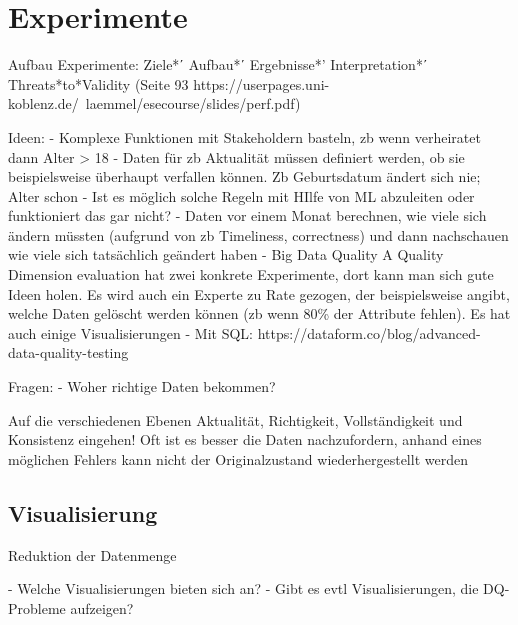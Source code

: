 \chapter{Experimente}\label{ch:experiments}

Aufbau Experimente: 
Ziele*ʹ Aufbau*ʹ Ergebnisse*' Interpretation*ʹ Threats*to*Validity
(Seite 93 https://userpages.uni-koblenz.de/~laemmel/esecourse/slides/perf.pdf)


Ideen:
- Komplexe Funktionen mit Stakeholdern basteln, zb wenn verheiratet dann Alter > 18
- Daten für zb Aktualität müssen definiert werden, ob sie beispielsweise überhaupt verfallen können. Zb Geburtsdatum ändert sich nie; Alter schon
- Ist es möglich solche Regeln mit HIlfe von ML abzuleiten oder funktioniert das gar nicht? 
- Daten vor einem Monat berechnen, wie viele sich ändern müssten (aufgrund von zb Timeliness, correctness) und dann nachschauen wie viele sich tatsächlich geändert haben
- Big Data Quality A Quality Dimension evaluation hat zwei konkrete Experimente, dort kann man sich gute Ideen holen. Es wird auch ein Experte zu Rate gezogen, der beispielsweise angibt, welche Daten gelöscht werden können (zb wenn 80\% der Attribute fehlen). Es hat auch einige Visualisierungen 
- Mit SQL: 
https://dataform.co/blog/advanced-data-quality-testing

Fragen:
- Woher richtige Daten bekommen?


Auf die verschiedenen Ebenen Aktualität, Richtigkeit, Vollständigkeit und Konsistenz eingehen!
Oft ist es besser die Daten nachzufordern, anhand eines möglichen Fehlers kann nicht der Originalzustand wiederhergestellt werden

\section{Visualisierung}
Reduktion der Datenmenge



- Welche Visualisierungen bieten sich an?
- Gibt es evtl Visualisierungen, die DQ-Probleme aufzeigen?


